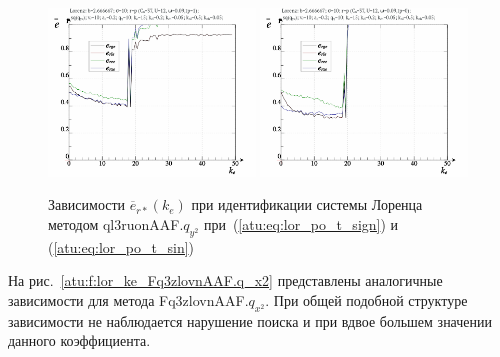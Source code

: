 \begin{figure}[ht!]
  \centerline{
    \includegraphics[width=0.49\textwidth]{p/cha/lor/ql3ruonAAF/lor_ql3ruonAAF_qy2-p_k_e_e_sign.png}
    \hfill
    \includegraphics[width=0.49\textwidth]{p/cha/lor/ql3ruonAAF/lor_ql3ruonAAF_qy2-p_k_e_e_sin.png}
  }
  \caption{Зависимости $\overline{e}_{r*}(k_e)$ при идентификации системы Лоренца методом ql3ruonAAF.$q_{y^2}$
   при~(\ref{atu:eq:lor_po_t_sign}) и (\ref{atu:eq:lor_po_t_sin})}
  \label{atu:f:lor_ke_ql3ruonAAF.q_y2}
\end{figure}

На рис.~\ref{atu:f:lor_ke_Fq3zlovnAAF.q_x2} представлены аналогичные зависимости
для метода  Fq3zlovnAAF.$q_{x^2}$. При общей подобной структуре зависимости
не наблюдается нарушение поиска и при вдвое большем значении данного коэффициента.

